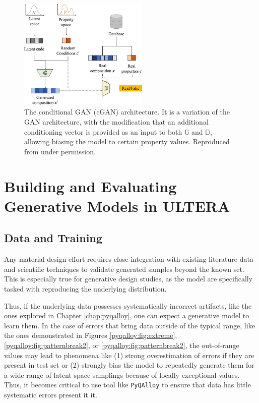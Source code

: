 \begin{figure}[H]
    \centering
    \includegraphics[width=0.55\textwidth]{inversedesign/inverse_fig2.png}
    \caption{The conditional GAN (cGAN) architecture. It is a variation of the GAN architecture, with the modification that an additional conditioning vector is provided as an input to both $\mathbb{G}$ and $\mathbb{D}$, allowing biasing the model to certain property values. Reproduced from \cite{Debnath2023ComparingAlloys} under permission.}
    \label{inverse:fig:cgan}
\end{figure}



\section{Building and Evaluating Generative Models in ULTERA} \label{inverse:sec:buildinggan}

\subsection{Data and Training} \label{inverse:ssec:datatrain}

Any material design effort requires close integration with existing literature data and scientific techniques to validate generated samples beyond the known set. This is especially true for generative design studies, as the model are specifically tasked with reproducing the underlying distribution. 

Thus, if the underlying data possesses systematically incorrect artifacts, like the ones explored in Chapter \ref{chap:pyqalloy}, one can expect a generative model to learn them. In the case of errors that bring data outside of the typical range, like the ones demonstrated in Figures \ref{pyqalloy:fig:extreme}, \ref{pyqalloy:fig:patternbreak2}, or \ref{pyqalloy:fig:patternbreak2}, the out-of-range values may lead to phenomena like (1) strong overestimation of errors if they are present in test set or (2) strongly bias the model to repeatedly generate them for a wide range of latent space samplings because of locally exceptional values. Thus, it becomes critical to use tool like \texttt{PyQAlloy} to ensure that data has little systematic errors present it it.


